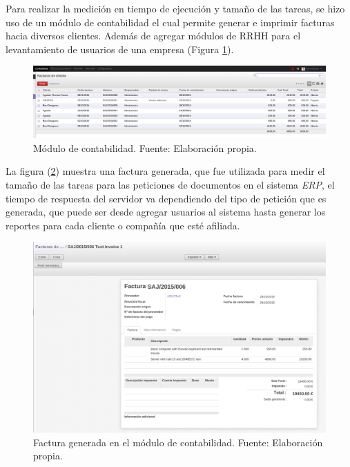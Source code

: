 \newpage
Para realizar la medición en tiempo de ejecución y tamaño de las tareas, se hizo uso de un módulo de contabilidad el cual permite generar e imprimir facturas hacia diversos clientes. Además de agregar módulos de RRHH para el levantamiento de usuarios de una empresa (Figura \ref{fig:ContOdoo}).

\renewcommand\thefigure{\arabic{figure}}
\begin{figure}[h!]
	\centering
	\includegraphics[scale=0.2]{media/odoo/3}
	\caption{Módulo de contabilidad. Fuente: Elaboración propia.}
	\label{fig:ContOdoo}
\end{figure}

La figura (\ref{fig:factOdoo}) muestra una factura generada, que fue utilizada para medir el tamaño de las tareas para las peticiones de documentos en el sistema \textit{ERP}, el tiempo de respuesta del servidor va dependiendo del tipo de petición que es generada, que puede ser desde agregar usuarios al sistema hasta generar los reportes para cada cliente o compañía que esté afiliada.

\newpage

\renewcommand\thefigure{\arabic{figure}}
\begin{figure}[h!]
	\centering
	\includegraphics[scale=0.2]{media/odoo/4}
	\caption{Factura generada en el módulo de contabilidad. Fuente: Elaboración propia.}
	\label{fig:factOdoo}
\end{figure}


